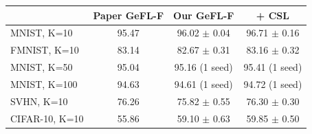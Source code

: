 \begin{tabular}{lccc}
\toprule
 & Paper GeFL-F & Our GeFL-F & + CSL \\
\midrule
MNIST, K=10 & 95.47 & 96.02 $\pm$ 0.04 & 96.71 $\pm$ 0.16 \\
FMNIST, K=10 & 83.14 & 82.67 $\pm$ 0.31 & 83.16 $\pm$ 0.32 \\
MNIST, K=50 & 95.04 & 95.16 (1 seed) & 95.41 (1 seed) \\
MNIST, K=100 & 94.63 & 94.61 (1 seed) & 94.72 (1 seed) \\
SVHN, K=10 & 76.26 & 75.82 $\pm$ 0.55 & 76.30 $\pm$ 0.30 \\
CIFAR-10, K=10 & 55.86 & 59.10 $\pm$ 0.63 & 59.85 $\pm$ 0.50 \\
\bottomrule
\end{tabular}

